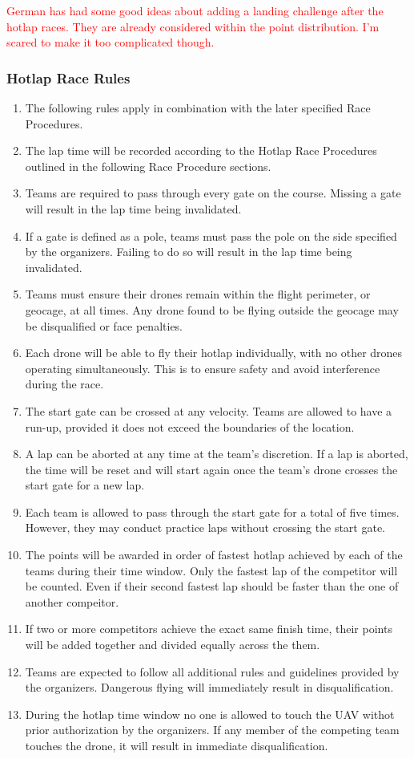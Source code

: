     \textcolor{red}{German has had some good ideas about adding a landing challenge after the hotlap races. They are already considered within the point distribution. I'm scared to make it too complicated though.}

    \subsubsection{Hotlap Race Rules}
    \begin{enumerate}
      \item The following rules apply in combination with the later specified Race Procedures.
      \item The lap time will be recorded according to the Hotlap Race Procedures outlined in the following Race Procedure sections.
      \item Teams are required to pass through every gate on the course. Missing a gate will result in the lap time being invalidated.
      \item If a gate is defined as a pole, teams must pass the pole on the side specified by the organizers. Failing to do so will result in the lap time being invalidated.
      \item Teams must ensure their drones remain within the flight perimeter, or geocage, at all times. Any drone found to be flying outside the geocage may be disqualified or face penalties.
      \item Each drone will be able to fly their hotlap individually, with no other drones operating simultaneously. This is to ensure safety and avoid interference during the race.
      \item The start gate can be crossed at any velocity. Teams are allowed to have a run-up, provided it does not exceed the boundaries of the location.
      \item A lap can be aborted at any time at the team's discretion. If a lap is aborted, the time will be reset and will start again once the team's drone crosses the start gate for a new lap.
      \item Each team is allowed to pass through the start gate for a total of five times. However, they may conduct practice laps without crossing the start gate.  
      \item The points will be awarded in order of fastest hotlap achieved by each of the teams during their time window. Only the fastest lap of the competitor will be counted. Even if their second fastest lap should be faster than the one of another compeitor.
      \item If two or more competitors achieve the exact same finish time, their points will be added together and divided equally across the them.  
      \item Teams are expected to follow all additional rules and guidelines provided by the organizers. Dangerous flying will immediately result in disqualification. 
      \item During the hotlap time window no one is allowed to touch the UAV withot prior authorization by the organizers. If any member of the competing team touches the drone, it will result in immediate disqualification.
    \end{enumerate}


